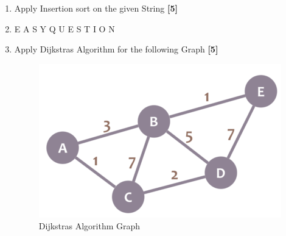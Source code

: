 \documentclass[12pt ,a4paper]{exam}
\begin{document}
	\begin{enumerate}[start=1,label={\bfseries Q\arabic*)}]
	\item Apply Insertion sort on the given String \hfill\textbf{[5]} 
	\item [] E A S Y Q U E S T I O N
	\item Apply Dijkstras Algorithm for the following Graph \hfill\textbf{[5]} 
	\begin{figure}[h]
		\centering
		\includegraphics[width=0.5\linewidth]{"Screenshot 2020-12-27 at 10.00.41 PM"}
		\caption{Dijkstras Algorithm Graph}
		\label{fig:screenshot-2020-12-27-at-10}
	\end{figure}
	

\end{enumerate}
\end{document}
